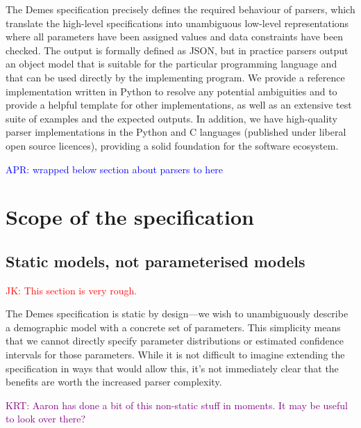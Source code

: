 \documentclass[11pt]{article}
\newcommand{\aprcomment}[1]{{\textcolor{blue}{APR: #1}}}
\newcommand{\jkcomment}[1]{{\textcolor{red}{JK: #1}}}
\newcommand{\krtcomment}[1]{{\textcolor{purple}{KRT: #1}}}
\begin{document}
The Demes specification precisely defines the required behaviour of parsers,
which translate the high-level specifications into unambiguous low-level
representations where all parameters have been assigned values and data
constraints have been checked. The output is formally defined as JSON, but in
practice parsers output an object model that is suitable for the particular
programming language and that can be used directly by the implementing program.
We provide a reference implementation written in Python to resolve any
potential ambiguities and to provide a helpful template for other
implementations, as well as an extensive test suite of examples and the
expected outputs. In addition, we have high-quality parser implementations in
the Python and C languages (published under liberal open source licences),
providing a solid foundation for the software ecosystem.

\aprcomment{wrapped below section about parsers to here}

\section{Scope of the specification}
\label{sec:appendix-scope}

\subsection{Static models, not parameterised models}
\label{sec:appendix-static}

\jkcomment{This section is very rough.}


The Demes specification is static by design---we wish to
unambiguously describe a demographic model with a concrete set
of parameters. This simplicity means that we cannot directly
specify parameter distributions or estimated confidence intervals
for those parameters. While it is not difficult to imagine extending
the specification in ways that would allow this, it's not immediately
clear that the benefits are worth the increased parser complexity.

\krtcomment{Aaron has done a bit of this non-static stuff in moments.  It may be useful to look over there?}
\end{document}
